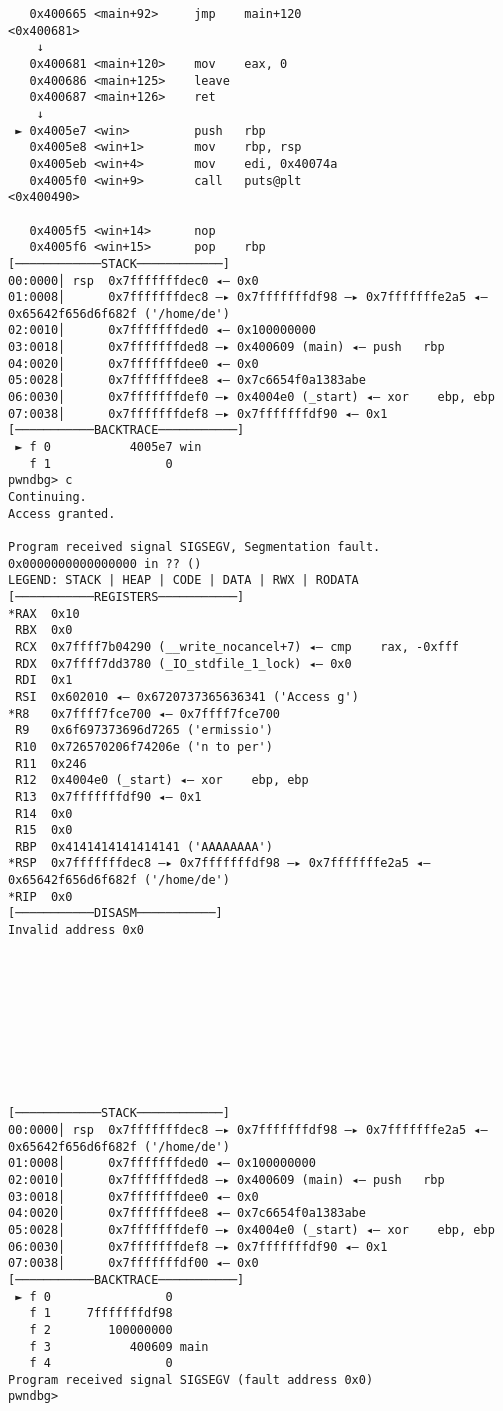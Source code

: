 \documentclass{article}
\begin{document}
\begin{lstlisting}
   0x400665 <main+92>     jmp    main+120                      <0x400681>
    ↓
   0x400681 <main+120>    mov    eax, 0
   0x400686 <main+125>    leave  
   0x400687 <main+126>    ret    
    ↓
 ► 0x4005e7 <win>         push   rbp
   0x4005e8 <win+1>       mov    rbp, rsp
   0x4005eb <win+4>       mov    edi, 0x40074a
   0x4005f0 <win+9>       call   puts@plt                      <0x400490>
 
   0x4005f5 <win+14>      nop    
   0x4005f6 <win+15>      pop    rbp
[────────────STACK────────────]
00:0000│ rsp  0x7fffffffdec0 ◂— 0x0
01:0008│      0x7fffffffdec8 —▸ 0x7fffffffdf98 —▸ 0x7fffffffe2a5 ◂— 0x65642f656d6f682f ('/home/de')
02:0010│      0x7fffffffded0 ◂— 0x100000000
03:0018│      0x7fffffffded8 —▸ 0x400609 (main) ◂— push   rbp
04:0020│      0x7fffffffdee0 ◂— 0x0
05:0028│      0x7fffffffdee8 ◂— 0x7c6654f0a1383abe
06:0030│      0x7fffffffdef0 —▸ 0x4004e0 (_start) ◂— xor    ebp, ebp
07:0038│      0x7fffffffdef8 —▸ 0x7fffffffdf90 ◂— 0x1
[───────────BACKTRACE───────────]
 ► f 0           4005e7 win
   f 1                0
pwndbg> c
Continuing.
Access granted.

Program received signal SIGSEGV, Segmentation fault.
0x0000000000000000 in ?? ()
LEGEND: STACK | HEAP | CODE | DATA | RWX | RODATA
[───────────REGISTERS───────────]
*RAX  0x10
 RBX  0x0
 RCX  0x7ffff7b04290 (__write_nocancel+7) ◂— cmp    rax, -0xfff
 RDX  0x7ffff7dd3780 (_IO_stdfile_1_lock) ◂— 0x0
 RDI  0x1
 RSI  0x602010 ◂— 0x6720737365636341 ('Access g')
*R8   0x7ffff7fce700 ◂— 0x7ffff7fce700
 R9   0x6f697373696d7265 ('ermissio')
 R10  0x726570206f74206e ('n to per')
 R11  0x246
 R12  0x4004e0 (_start) ◂— xor    ebp, ebp
 R13  0x7fffffffdf90 ◂— 0x1
 R14  0x0
 R15  0x0
 RBP  0x4141414141414141 ('AAAAAAAA')
*RSP  0x7fffffffdec8 —▸ 0x7fffffffdf98 —▸ 0x7fffffffe2a5 ◂— 0x65642f656d6f682f ('/home/de')
*RIP  0x0
[───────────DISASM───────────]
Invalid address 0x0










[────────────STACK────────────]
00:0000│ rsp  0x7fffffffdec8 —▸ 0x7fffffffdf98 —▸ 0x7fffffffe2a5 ◂— 0x65642f656d6f682f ('/home/de')
01:0008│      0x7fffffffded0 ◂— 0x100000000
02:0010│      0x7fffffffded8 —▸ 0x400609 (main) ◂— push   rbp
03:0018│      0x7fffffffdee0 ◂— 0x0
04:0020│      0x7fffffffdee8 ◂— 0x7c6654f0a1383abe
05:0028│      0x7fffffffdef0 —▸ 0x4004e0 (_start) ◂— xor    ebp, ebp
06:0030│      0x7fffffffdef8 —▸ 0x7fffffffdf90 ◂— 0x1
07:0038│      0x7fffffffdf00 ◂— 0x0
[───────────BACKTRACE───────────]
 ► f 0                0
   f 1     7fffffffdf98
   f 2        100000000
   f 3           400609 main
   f 4                0
Program received signal SIGSEGV (fault address 0x0)
pwndbg> 
\end{lstlisting}
\end{document}
